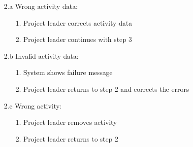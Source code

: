 \documentclass[a4paper, 10pt, oneside, draft]{article}
\begin{document}
\begin{usecase}
{	\item[2.a] Wrong activity data:
		\begin{enumerate}
		\item[1.] Project leader corrects activity data
		\item[2.] Project leader continues with step 3
		\end{enumerate}
	\item[2.b] Invalid activity data:
		\begin{enumerate}
		\item[1.] System shows failure message
		\item[2.] Project leader returns to step 2 and corrects the errors
		\end{enumerate}
	\item[2.c] Wrong activity:
		\begin{enumerate}
		\item[1.] Project leader removes activity
		\item[2.] Project leader returns to step 2
		\end{enumerate}
	
	
}

\end{usecase}
\end{document}
